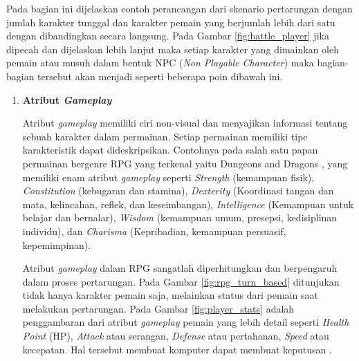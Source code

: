 Pada bagian ini dijelaskan contoh perancangan dari skenario pertarungan dengan jumlah karakter tunggal dan karakter pemain yang berjumlah lebih dari satu dengan dibandingkan secara langsung. Pada Gambar \ref{fig:battle_player} jika dipecah dan dijelaskan lebih lanjut maka setiap karakter yang dimainkan oleh pemain atau musuh dalam bentuk NPC (\textit{Non Playable Character}) maka bagian-bagian tersebut akan menjadi seperti beberapa poin dibawah ini.

\begin{enumerate}[label=\textbf{\arabic*).}]
	
	\item \textbf{Atribut \textit{Gameplay}}
	\setlength{\parindent}{0.8cm}
	
	Atribut \textit{gameplay} memiliki ciri non-visual dan menyajikan informasi tentang sebuah karakter dalam permainan. Setiap permainan memiliki tipe karakteristik dapat dideskripsikan. Contohnya pada salah satu papan permainan bergenre RPG yang terkenal yaitu Dungeons and Dragons \citep{heinsoo2008}, yang memiliki enam atribut \textit{gameplay} seperti \textit{Strength} (kemampuan fisik), \textit{Constitution} (kebugaran dan stamina), \textit{Dexterity} (Koordinasi tangan dan mata, kelincahan, reflek, dan keseimbangan), \textit{Intelligence} (Kemampuan untuk belajar dan bernalar), \textit{Wisdom} (kemampuan umum, presepsi, kedisiplinan individu), dan \textit{Charisma} (Kepribadian, kemampuan persuasif, kepemimpinan).
	\vspace{1ex}
	
	Atribut \textit{gameplay} dalam RPG sangatlah diperhitungkan dan berpengaruh dalam proses pertarungan. Pada Gambar \ref{fig:rpg_turn_based} ditunjukan tidak hanya karakter pemain saja, melainkan status dari pemain saat melakukan pertarungan. Pada Gambar \ref{fig:player_stats} adalah penggambaran dari atribut \textit{gameplay} pemain yang lebih detail seperti \textit{Health Point} (HP), \textit{Attack} atau serangan, \textit{Defense} atau pertahanan, \textit{Speed} atau kecepatan. Hal tersebut membuat komputer dapat membuat keputusan \citep{danschuller2020}.
	\vspace{1ex}
	

\end{enumerate}
